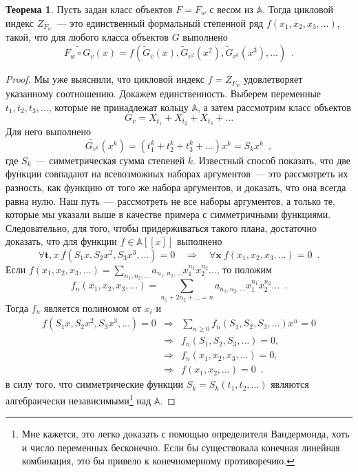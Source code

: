 \documentclass[a5paper]{article}
\def \vec {\boldsymbol}
\theoremstyle{definition}
\newtheorem*{theorem}{Теорема}
\begin{document}
\begin{theorem}
    Пусть задан класс объектов \( F = F_w \) с весом из \( \mathbb A \). Тогда цикловой индекс \( Z_{F_w} \)~--- это
единственный формальный степенной ряд \( f(x_1, x_2, x_3, \ldots) \), такой, что
для любого класса объектов \( G \) выполнено
\[
    \widetilde{F_w \circ G_v}(x) = f(\widetilde G_v(x), \widetilde G_{v^2}(x^2), \widetilde
G_{v^3}(x^3), \ldots) \enspace .
\] 
\end{theorem}
\begin{proof}
    Мы уже выяснили, что цикловой индекс \( f = Z_{F_w} \) удовлетворяет
указанному соотношению. Докажем единственность. Выберем переменные \( t_1, t_2,
t_3, \ldots \), которые не принадлежат кольцу \( \mathbb A \), а затем
рассмотрим класс объектов
\[
    G_v = X_{t_1} + X_{t_2} + X_{t_3} + \ldots
\]
Для него выполнено
\[
    \widetilde{G_{v^k}}(x^k) = (t_1^k + t_2^k + t_3^k + \ldots) x^k = S_k x^k
\enspace ,
\]
где \( S_k \)~--- симметрическая сумма степеней \( k \).
Известный способ показать, что две функции совпадают на всевозможных наборах
аргументов~--- это рассмотреть их разность, как функцию от того же набора
аргументов, и доказать, что она всегда равна нулю. Наш путь~--- рассмотреть не
все наборы аргументов, а только те, которые мы указали выше в качестве примера с
симметричными функциями. Следовательно, для того, чтобы придерживаться такого
плана, достаточно доказать,
что для функции \( f \in \mathbb A [ [ x ] ] \) выполнено
\[
    \forall \vec t, x \ 
    f(S_1 x, S_2 x^2, S_3 x^3, \ldots ) = 0 \quad 
    \Rightarrow \quad
    \forall \vec x\ 
    f(x_1, x_2, x_3, \ldots) = 0 \enspace .
\]
Если \( f(x_1, x_2, x_3, \ldots) = \sum_{n_1, n_2, \ldots} a_{n_1,n_2, \ldots}
x_1^{n_1} x_2^{n_2} \ldots \), то положим
\[
    f_n(x_1, x_2, x_3, \ldots) = \sum_{n_1 + 2n_2 + \ldots = n}
    a_{n_1, n_2, \ldots} x_1^{n_1} x_2^{n_2} \ldots \enspace .
\] 
Тогда \( f_n \) является полиномом от \( x_i \) и 
\begin{eqnarray*}
    f(S_1 x, S_2 x^2, S_3 x^3, \ldots) = 0 & \Rightarrow & 
    \sum_{n \geq 0} f_n(S_1, S_2, S_3, \ldots) x^n = 0\\
    & \Rightarrow & f_n(S_1, S_2, S_3, \ldots) = 0 , \\
    & \Rightarrow & f_n(x_1, x_2, x_3, \ldots) = 0, \\
    & \Rightarrow & f(x_1, x_2, \ldots) = 0 \enspace .
\end{eqnarray*}
в силу того, что симметрические функции \( S_k = S_k(t_1, t_2, \ldots) \)
являются алгебраически независимыми\footnote{Мне кажется, это легко доказать с
помощью определителя Вандермонда, хоть и число переменных бесконечно. Если бы
существовала конечная линейная комбинация, это бы привело к конечномерному
противоречию.} над \( \mathbb A \). 
\end{proof}
\end{document}
